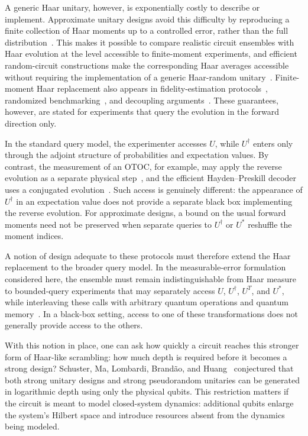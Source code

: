 \documentclass[
    aps,
    superscriptaddress,
    onecolumn,
    10pt,
    prx,
    nofootinbib
]{revtex4-2}
\theoremstyle{namedstatement}
\theoremstyle{plain}
\begin{document}
A generic Haar unitary, however, is exponentially costly to describe or
implement. Approximate unitary designs avoid this difficulty by reproducing a
finite collection of Haar moments up to a controlled error, rather than the full
distribution~\cite{Emerson_2003,Gross_2007,dankert2005efficientsimulationrandomquantum}.
This makes it possible to compare realistic circuit ensembles with Haar
evolution at the level accessible to finite-moment experiments, and efficient
random-circuit constructions make the corresponding Haar averages accessible
without requiring the implementation of a generic Haar-random
unitary~\cite{HarrowLow2009,BrandaoHarrowHorodecki2016}. Finite-moment Haar
replacement also appears in fidelity-estimation protocols~\cite{Dankert_2009},
randomized benchmarking~\cite{MagesanGambettaEmerson2011}, and decoupling
arguments~\cite{HaydenPreskill2007,BrownFawzi2015}. These guarantees, however,
are stated for experiments that query the evolution in the forward direction
only.

In the standard query model, the experimenter accesses $U$, while $U^\dagger$
enters only through the adjoint structure of probabilities and expectation
values. By contrast, the measurement of an OTOC, for example, may apply the reverse evolution
as a separate physical step~\cite{SwingleEtAl2016}, and the efficient
Hayden--Preskill decoder uses a conjugated evolution~\cite{YoshidaKitaev2017}.
Such access is genuinely different: the appearance of $U^\dagger$ in an
expectation value does not provide a separate black box implementing the reverse
evolution. For approximate designs, a bound on the usual forward moments need
not be preserved when separate queries to $U^\dagger$ or $U^*$ reshuffle the
moment indices.

A notion of design adequate to these protocols must therefore extend the Haar
replacement to the broader query model. In the measurable-error formulation
considered here, the ensemble must remain indistinguishable from Haar measure to
bounded-query experiments that may separately access $U$, $U^\dagger$, $U^T$,
and $U^*$, while interleaving these calls with arbitrary quantum operations and
quantum memory~\cite{SchusterEtAlStrong2025}. In a black-box setting, access to
one of these transformations does not generally provide access to the others.

With this notion in place, one can ask how quickly a circuit reaches this
stronger form of Haar-like scrambling: how much depth is required before it
becomes a strong design? Schuster, Ma, Lombardi, Brand\~{a}o, and
Huang~\cite{SchusterEtAlStrong2025} conjectured that both strong unitary designs
and strong pseudorandom unitaries can be generated in logarithmic depth using
only the physical qubits. This restriction matters if the circuit is meant to
model closed-system dynamics: additional qubits enlarge the system's Hilbert
space and introduce resources absent from the dynamics being modeled.
\end{document}
